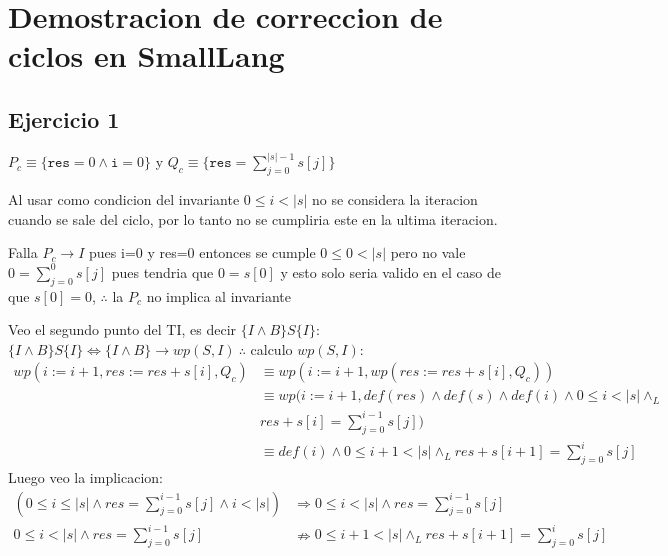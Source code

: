 \documentclass{article}
\begin{document}
\newcommand{\tuno}{$P_c\to I$}
\newcommand{\tdos}{$\{I\land B\}S\{I\}\Longleftrightarrow \{I\land B\}\to wp(S,I)$}
\newcommand{\enRango}[2]{0\leq #1 <|#2|}
\newcommand{\enRangoInc}[2]{0\leq #1 \leq|#2|}
\newcommand{\cont}{ \setcounter{equation}{0}}
\newcommand{\entero}{\mathbb{Z}}
\section*{Demostracion de correccion de ciclos en SmallLang}
\subsection*{Ejercicio 1}
\begin{itemize}\normalsize{
    \item [a) ] $P_c\equiv\{\texttt{res}=0 \land \texttt{i}=0\}$ y $Q_c\equiv\{\texttt{res}=\sum\limits_{j=0}^{|s|-1}s[j]\}$
    \item [b) ] Al usar como condicion del invariante $0\leq i<|s|$ no se 
    considera la iteracion cuando se sale del ciclo, por lo tanto no se cumpliria 
    este en la ultima iteracion.
    \item [c) ] Falla $P_c\to I$ pues i=0 y res=0 entonces se cumple $0\leq0<|s|$ pero no vale $0=\sum\limits_{j=0}^{0}s[j]$ 
    pues tendria que $0=s[0]$ y esto solo seria valido en el caso de que $s[0]=0$, 
     $\therefore$ la $P_c$ no implica al invariante
    \item [d) ] Veo el segundo punto del TI, es decir \texttt{$\{I\land B\}S\{I\}$}:\\
    $\{I\land B\}S\{I\}\Longleftrightarrow \{I\land B\}\to wp(S,I) \ \therefore$ calculo $wp(S,I)$:
    \begin{align}
        wp(i:=i+1,res:=res+s[i],Q_c)&\equiv wp(i:=i+1,wp(res:=res+s[i],Q_c))\\
        &\equiv wp(i:=i+1,def(res)\land def(s)\land def(i)\land \enRango{i}{s}\land_L\\\nonumber
        & res+s[i]=\sum\limits_{j=0}^{i-1}s[j])\\
        &\equiv def(i)\land \enRango{i+1}{s}\land_L res+s[i+1]=\sum\limits_{j=0}^{i}s[j]
    \end{align}
    Luego veo la implicacion:
    \setcounter{equation}{0}\begin{align}
        (0\leq i\leq|s| \land res=\sum\limits_{j=0}^{i-1}s[j] \land i<|s|) &\Rightarrow  \enRango{i}{s} \land res=\sum\limits_{j=0}^{i-1}s[j]\\
        \enRango{i}{s} \land res=\sum\limits_{j=0}^{i-1}s[j] &\nRightarrow \enRango{i+1}{s}\land_L res+s[i+1]=\sum\limits_{j=0}^{i}s[j]

\end{align}}
\end{itemize}
\end{document}
